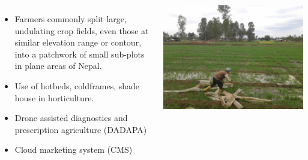 \documentclass[11pt,dvipsnames,ignorenonframetext,aspectratio=169]{beamer}
\begin{document}
\begin{frame}{}
\protect\hypertarget{section-7}{}
\begin{columns}[T, onlytextwidth]

\begin{itemize}
\item Farmers commonly split large, undulating crop fields, even those at similar elevation range or contour, into a
patchwork of small sub-plots in plane areas of Nepal.
\item Use of hotbeds, coldframes, shade house in horticulture.
\item Drone assisted diagnostics and prescription agriculture (DADAPA)
\item Cloud marketing system (CMS)
\end{itemize}



\includegraphics[width=0.9\linewidth]{../images/irrigating_farmer} 

\end{columns}
\end{frame}
\end{document}
